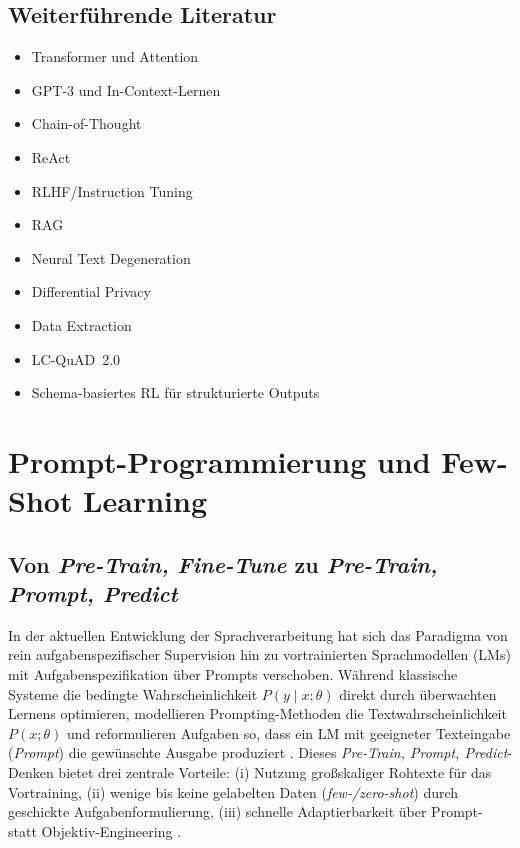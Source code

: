 \subsection*{Weiterführende Literatur}
\begin{itemize}
  \item Transformer und Attention \cite{vaswani2017attention}
  \item GPT-3 und In-Context-Lernen \cite{brown2020language}
  \item Chain-of-Thought \cite{wei2022chain}
  \item ReAct \cite{yao2023react}
  \item RLHF/Instruction Tuning \cite{ouyang2022training}
  \item RAG \cite{lewis2020rag}
  \item Neural Text Degeneration \cite{holtzman2020curious}
  \item Differential Privacy \cite{abadi2016deep}
  \item Data Extraction \cite{carlini2021extracting}
  \item LC-QuAD~2.0 \cite{dubey2019lcquad2}
  \item Schema-basiertes RL für strukturierte Outputs \cite{cong2023schema}
\end{itemize}






\section{Prompt-Programmierung und Few-Shot Learning}
\label{sec:prompting}


\subsection{Von \emph{Pre-Train, Fine-Tune} zu \emph{Pre-Train, Prompt, Predict}}
In der aktuellen Entwicklung der Sprachverarbeitung hat sich das Paradigma von rein aufgaben\-spezifischer Supervision hin zu vortrainierten Sprachmodellen (LMs) mit Aufgabenspezifikation über Prompts verschoben. Während klassische Systeme die bedingte Wahrscheinlichkeit \(P(y \mid x;\theta)\) direkt durch überwachten Lernens optimieren, modellieren Prompting-Methoden die Textwahrscheinlichkeit \(P(x;\theta)\) und reformulieren Aufgaben so, dass ein LM mit geeigneter Texteingabe (\emph{Prompt}) die gewünschte Ausgabe produziert \cite{liu2023survey}. Dieses \emph{Pre-Train, Prompt, Predict}-Denken bietet drei zentrale Vorteile: (i) Nutzung großskaliger Rohtexte für das Vortraining, (ii) wenige bis keine gelabelten Daten (\emph{few-/zero-shot}) durch geschickte Aufgabenformulierung, (iii) schnelle Adaptierbarkeit über Prompt- statt Objektiv-Engineering \cite{liu2023survey}.

